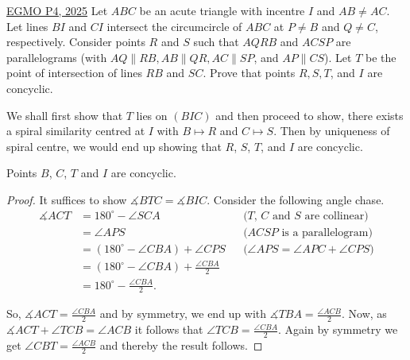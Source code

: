 \begin{problem}{7}{\href{https://artofproblemsolving.com/community/q2h3548106p35507758}{EGMO P4, 2025}} 
	Let $ABC$ be an acute triangle with incentre $I$ and $AB \neq AC$. Let lines $BI$ and $CI$ intersect the circumcircle of $ABC$ at $P \neq B$ and $Q \neq C$, respectively. Consider points $R$ and $S$ such that $AQRB$ and $ACSP$ are parallelograms (with $AQ \parallel RB, AB \parallel QR, AC \parallel SP$, and $AP \parallel CS$). Let $T$ be the point of intersection of lines $RB$ and $SC$. Prove that points $R, S, T$, and $I$ are concyclic.
	\begin{solution} We shall first show that $T$ lies on $(BIC)$ and then proceed to show, there exists a spiral similarity centred at $I$ with $B\mapsto R$ and $C\mapsto S$. Then by uniqueness of spiral centre, we would end up showing that $R$, $S$, $T$, and $I$ are concyclic.
	\begin{numclaim}{1} 
		Points $B$, $C$, $T$ and $I$ are concyclic.
	\end{numclaim}
	\begin{proof} It suffices to show $\measuredangle BTC=\measuredangle BIC$. Consider the following angle chase.
	\begin{align*}
	\measuredangle ACT &=180^{\circ}-\angle SCA &&\text{($T$, $C$ and $S$ are collinear)}\\ &=\angle APS &&\text{($ACSP$ is a parallelogram)}\\ &=(180^{\circ}-\angle CBA)+\angle CPS &&\text{($\angle APS=\angle APC+\angle CPS$)}\\ &=(180^{\circ}-\angle CBA)+\frac{\angle CBA}{2}&&\\ &=180^{\circ}-\frac{\angle CBA}{2}.&&
	\end{align*}
	\par So, $\measuredangle ACT=\frac{\angle CBA}{2}$ and by symmetry, we end up with $\measuredangle TBA=\frac{\angle ACB}{2}$. Now, as $\measuredangle ACT+\angle TCB=\angle ACB$ it follows that $\angle TCB=\frac{\angle CBA}{2}$. Again by symmetry we get $\angle CBT=\frac{\angle ACB}{2}$ and thereby the result follows.
	\end{proof}
	

\end{solution}
\end{problem}
